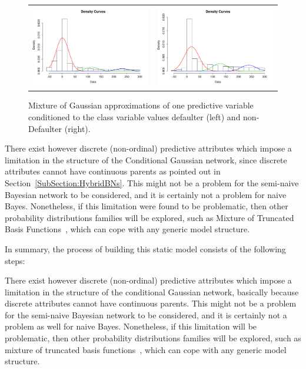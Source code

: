 \begin{figure}[htbp]
  \centering
    \begin{tabular}{cc}
    \includegraphics[width=70mm]{figures/CajaMarmixtureBalanceDef}&
    \includegraphics[width=70mm]{figures/CajaMarmixtureBalanceNonDef}\\
  \end{tabular}
    \caption{\label{Figure:cajamarMixt}Mixture of Gaussian approximations of one predictive variable conditioned to the class variable values defaulter (left) and non-Defaulter (right).}
\end{figure}

There exist however discrete (non-ordinal) predictive attributes which impose a limitation in the structure of the Conditional Gaussian network, since discrete attributes cannot have continuous parents as pointed out in Section~\ref{SubSection:HybridBNs}. This might not be a problem for the semi-naive Bayesian network to be considered, and it is certainly not a problem for naive Bayes. Nonetheless, if this limitation were found to be problematic, then other probability distributions families will be explored, such as Mixture of Truncated Basis Functions~\cite{Lan12}, which can cope with any generic model structure. 

In summary, the process of building this static model consists of the following steps:

There exist however discrete (non-ordinal) predictive attributes which impose a limitation in the structure of the conditional Gaussian network, basically because discrete attributes cannot have continuous parents. This might not be a problem for the semi-naive Bayesian network to be considered, and it is certainly not a problem as well for naive Bayes. Nonetheless, if this limitation will be problematic, then other probability distributions families will be explored, such as mixture of truncated basis functions~\cite{Lan12}, which can cope with any generic model structure. 

